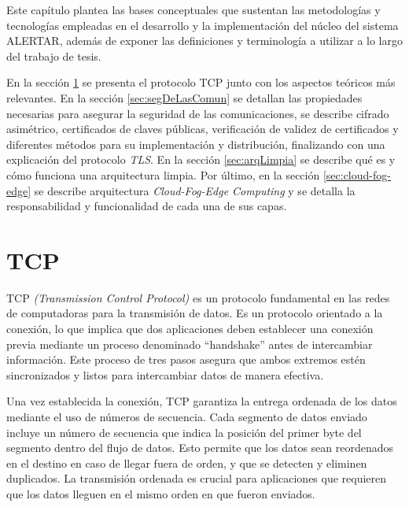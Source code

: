 Este capítulo plantea las bases conceptuales que sustentan las metodologías y tecnologías empleadas en el desarrollo y la implementación del núcleo del sistema ALERTAR, además de exponer las definiciones y terminología a utilizar a lo largo del trabajo de tesis. %

En la sección \ref{sec:TCP} se presenta el protocolo TCP junto con los aspectos teóricos más relevantes. En la sección \ref{sec:segDeLasComun} se detallan las propiedades necesarias para asegurar la seguridad de las comunicaciones, se describe cifrado asimétrico, certificados de claves públicas, verificación de validez de certificados y diferentes métodos para su implementación y distribución, finalizando con una explicación del protocolo \textit{TLS}. En la sección \ref{sec:arqLimpia} se describe qué es y cómo funciona una arquitectura limpia. Por último, en la sección \ref{sec:cloud-fog-edge} se describe arquitectura \textit{Cloud-Fog-Edge Computing} y se detalla la responsabilidad y funcionalidad de cada una de sus capas.
\section{TCP}
\label{sec:TCP}
TCP \textit{(Transmission Control Protocol)} es un protocolo fundamental en las redes de computadoras para la transmisión de datos. Es un protocolo orientado a la conexión, lo que implica que dos aplicaciones deben establecer una conexión previa mediante un proceso denominado ``handshake'' antes de intercambiar información. Este proceso de tres pasos asegura que ambos extremos estén sincronizados y listos para intercambiar datos de manera efectiva.

Una vez establecida la conexión, TCP garantiza la entrega ordenada de los datos mediante el uso de números de secuencia. Cada segmento de datos enviado incluye un número de secuencia que indica la posición del primer byte del segmento dentro del flujo de datos. Esto permite que los datos sean reordenados en el destino en caso de llegar fuera de orden, y que se detecten y eliminen duplicados. La transmisión ordenada es crucial para aplicaciones que requieren que los datos lleguen en el mismo orden en que fueron enviados.

